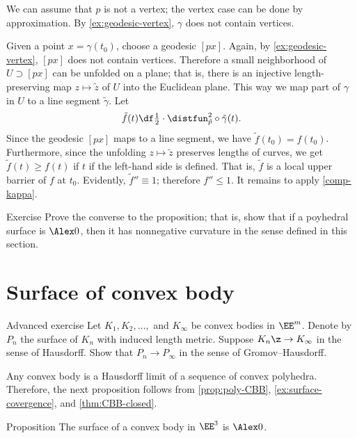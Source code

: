 We can assume that $p$ is not a vertex;
the vertex case can be done by approximation.
By \ref{ex:geodesic-vertex}, $\gamma$ does not contain vertices.

Given a point $x=\gamma(t_0)$, choose a geodesic $[px]$.
Again, by \ref{ex:geodesic-vertex}, $[px]$ does not contain vertices.
Therefore a small neighborhood of $U\supset [px]$ can be unfolded on a plane;
that is, there is an injective length-preserving map $z\mapsto \tilde z$
of $U$ into the Euclidean plane.
This way we map part of $\gamma$ in $U$ to a line segment $\tilde\gamma$.
Let
\[\tilde f(t)\df\tfrac12\cdot\distfun_{\tilde p}^2\circ\tilde \gamma(t).\]
Since the geodesic $[px]$ maps to a line segment, we have $\tilde f(t_0)= f(t_0)$.
Furthermore, since the unfolding $z\mapsto \tilde z$ preserves lengths of curves, we get
$\tilde f(t)\ge f(t)$ if $t$ if the left-hand side is defined.
That is, $\tilde f$ is a local upper barrier of $f$ at $t_0$.
Evidently, $\tilde f''\equiv 1$; therefore $f''\le 1$.
It remains to apply \ref{comp-kappa}.
\qeds

\begin{thm}{Exercise}\label{ex:poly-CBB}
Prove the converse to the proposition;
that is, show that if a poyhedral surface is $\Alex0$, then it has nonnegative curvature in the sense defined in this section.
\end{thm}

\section{Surface of convex body}

\begin{thm}{Advanced exercise}\label{ex:surface-covergence}
Let $K_1,K_2,\dots,$ and $K_\infty$ be convex bodies in $\EE^m$.
Denote by $P_n$ the surface of $K_n$ with induced length metric.
Suppose $K_n\z\to K_\infty$ in the sense of Hausdorff.
Show that $P_n\to P_\infty$ in the sense of Gromov--Hausdorff.
\end{thm}

Any convex body is a Hausdorff limit of a sequence of convex polyhedra.
Therefore, the next proposition follows from \ref{prop:poly-CBB}, \ref{ex:surface-covergence}, and \ref{thm:CBB-closed}.

\begin{thm}{Proposition}\label{prop:conv-surf-CBB(0)}
The surface of a convex body in $\EE^3$ is $\Alex0$.
\end{thm}

